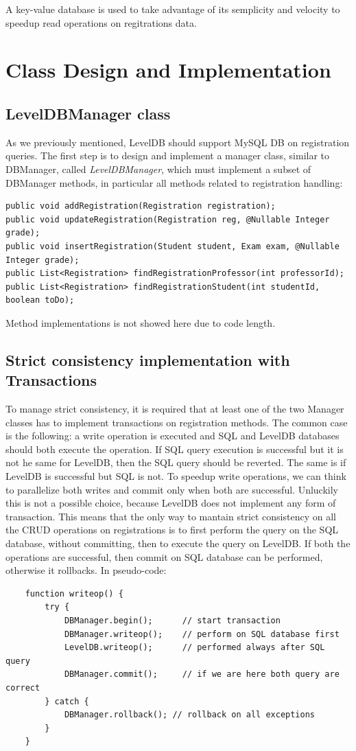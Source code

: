 \documentclass{report}
\begin{document}
A key-value database is used to take advantage of its semplicity and velocity to speedup read operations on regitrations data.

\section*{Class Design and Implementation}
\subsection*{LevelDBManager class}
As we previously mentioned, LevelDB should support MySQL DB on registration queries. The first step is to design and implement a manager class, similar to DBManager, called \textit{LevelDBManager}, which must implement a subset of DBManager methods, in particular all methods related to registration handling:
\begin{lstlisting}
public void addRegistration(Registration registration);
public void updateRegistration(Registration reg, @Nullable Integer grade);
public void insertRegistration(Student student, Exam exam, @Nullable Integer grade);
public List<Registration> findRegistrationProfessor(int professorId);
public List<Registration> findRegistrationStudent(int studentId, boolean toDo);
\end{lstlisting}
Method implementations is not showed here due to code length.

\subsection*{Strict consistency implementation with Transactions}
To manage strict consistency, it is required that at least one of the two Manager classes has to implement transactions on registration methods. The common case is the following: a write operation is executed and SQL and LevelDB databases should both execute the operation. If SQL query execution is successful but it is not he same for LevelDB, then the SQL query should be reverted. The same is if LevelDB is successful but SQL is not. To speedup write operations, we can think to parallelize both writes and commit only when both are successful. Unluckily this is not a possible choice, because LevelDB does not implement any form of transaction. This means that the only way to mantain strict consistency on all the CRUD operations on registrations is to first perform the query on the SQL database, without committing, then to execute the query on LevelDB. If both the operations are successful, then commit on SQL database can be performed, otherwise it rollbacks. In pseudo-code:
\begin{lstlisting}
	function writeop() {
		try {
			DBManager.begin();		// start transaction
			DBManager.writeop(); 	// perform on SQL database first
			LevelDB.writeop();		// performed always after SQL query
			DBManager.commit();		// if we are here both query are correct
		} catch {
			DBManager.rollback(); // rollback on all exceptions
		}
	}
\end{lstlisting}
\end{document}
